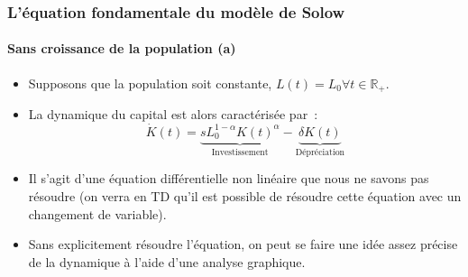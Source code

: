 \documentclass[10pt,notheorems]{beamer}
\theoremstyle{plain}
\theoremstyle{definition} %
\begin{document}
\begin{frame}
  \frametitle{L'équation fondamentale du modèle de Solow}
  \framesubtitle{Sans croissance de la population (a)}

  \begin{itemize}

  \item Supposons que la population soit constante, $L(t) = L_0\forall t\in\mathbb R_+$.\newline

  \item La dynamique du capital est alors caractérisée par~:
    \bigskip
    \[
      \dot K(t) =  \underbrace{s L_0^{1-\alpha}K(t)^{\alpha}}_{\text{Investissement}} -  \underbrace{\delta K(t)}_{\text{Dépréciation}}
    \]

    \bigskip

  \item Il s'agit d'une équation différentielle non linéaire que nous ne savons pas résoudre (on verra en TD qu'il est possible de résoudre cette équation avec un changement de variable).\newline

  \item Sans explicitement résoudre l'équation, on peut se faire une idée assez précise de la dynamique à l'aide d'une analyse graphique.\newline
  \end{itemize}

\end{frame}
\end{document}
